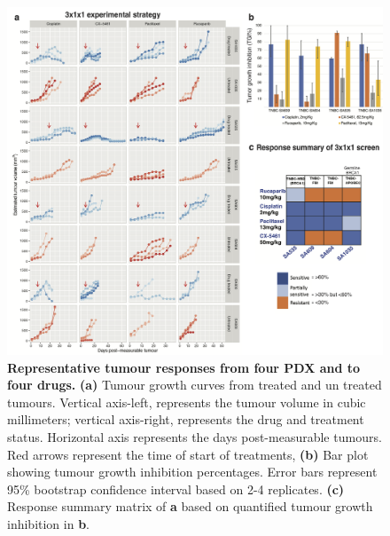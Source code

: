 \begin{figure}
\centering
	\includegraphics[width=\textwidth]{Figures/chap3/4drugs4PDXnew.png}
	\caption[Representative tumour responses from four PDX and  to four drugs]
	{\small
	   \textbf{Representative tumour responses from four PDX and  to four drugs.}
	    \textbf{(a)} Tumour growth curves from treated and un treated tumours. Vertical axis-left, represents the tumour volume in cubic millimeters; vertical axis-right, represents the drug and treatment status. Horizontal axis represents the days post-measurable tumours. Red arrows represent the time of start of treatments,
	   \textbf{(b)} Bar plot showing tumour growth inhibition percentages. Error bars represent 95\% bootstrap confidence interval based on 2-4 replicates.  \textbf{(c)} Response summary matrix of \textbf{a} based on quantified tumour growth inhibition in \textbf{b}.
	    }
	\label{fig:invivo}
\end{figure}



